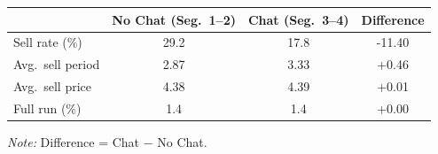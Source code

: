 \begingroup
\centering
\small
\begin{tabular}{lccc}
\toprule
 & No Chat (Seg.\ 1--2) & Chat (Seg.\ 3--4) & Difference \\
\midrule
  Sell rate (\%) & 29.2 & 17.8 & -11.40 \\
  Avg.\ sell period & 2.87 & 3.33 & +0.46 \\
  Avg.\ sell price & 4.38 & 4.39 & +0.01 \\
  Full run (\%) & 1.4 & 1.4 & +0.00 \\
\bottomrule
\end{tabular}
\par
\vspace{2pt}
{\footnotesize \textit{Note:} Difference = Chat $-$ No Chat.}
\endgroup

